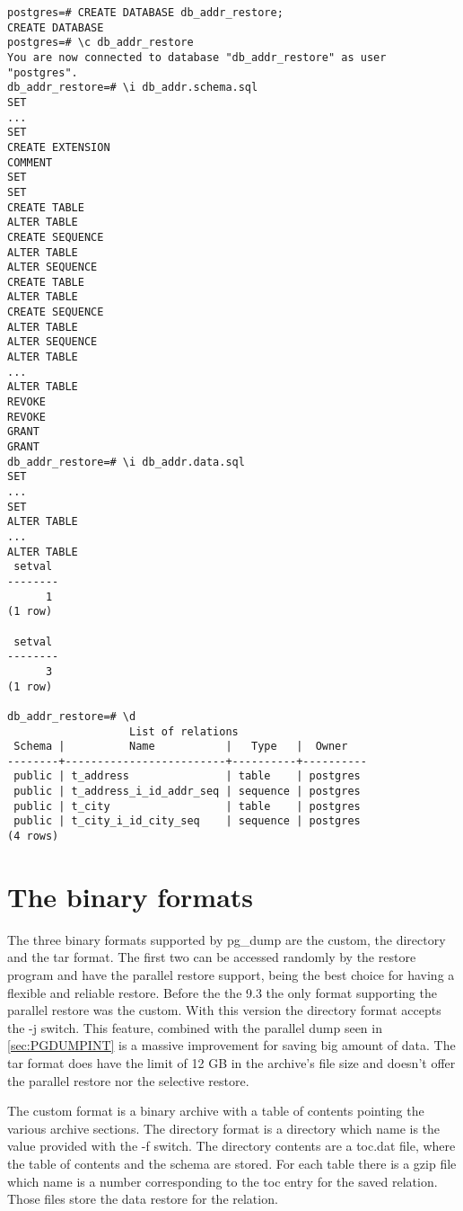 \begin{lstlisting}[style=pgsql]
postgres=# CREATE DATABASE db_addr_restore;
CREATE DATABASE
postgres=# \c db_addr_restore 
You are now connected to database "db_addr_restore" as user "postgres".
db_addr_restore=# \i db_addr.schema.sql 
SET
...
SET
CREATE EXTENSION
COMMENT
SET
SET
CREATE TABLE
ALTER TABLE
CREATE SEQUENCE
ALTER TABLE
ALTER SEQUENCE
CREATE TABLE
ALTER TABLE
CREATE SEQUENCE
ALTER TABLE
ALTER SEQUENCE
ALTER TABLE
...
ALTER TABLE
REVOKE
REVOKE
GRANT
GRANT
db_addr_restore=# \i db_addr.data.sql 
SET
...
SET
ALTER TABLE
...
ALTER TABLE
 setval 
--------
      1
(1 row)

 setval 
--------
      3
(1 row)

db_addr_restore=# \d
                   List of relations
 Schema |          Name           |   Type   |  Owner   
--------+-------------------------+----------+----------
 public | t_address               | table    | postgres
 public | t_address_i_id_addr_seq | sequence | postgres
 public | t_city                  | table    | postgres
 public | t_city_i_id_city_seq    | sequence | postgres
(4 rows)

\end{lstlisting}



\section{The binary formats}
\label{sec:PGDUMPBINFMT}
The three binary formats supported by pg\_dump are the custom, the directory and the tar format. 
The first two can be accessed randomly by the restore program and have the parallel restore 
support, being the best choice for having a flexible and reliable restore. Before the the 9.3 the 
only format supporting the parallel restore was the custom. With this version the directory 
format accepts the -j switch. This feature, combined with the parallel dump seen in 
\ref{sec:PGDUMPINT} is a massive improvement for saving big amount of data. The tar format does 
have the limit of 12 GB in the archive's file size and doesn't offer the parallel restore nor the 
selective restore. \newline

The custom format is a binary archive with a table of contents pointing the various archive 
sections. The directory format is a directory which name is the value provided with the -f switch. 
The directory contents are a toc.dat file, where the table of contents and the schema are stored. 
For each table there is a gzip file which name is a number corresponding to the toc entry for the 
saved relation. Those files store the data restore for the relation.\newline


